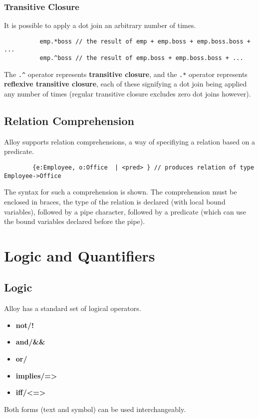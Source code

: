 \documentclass[10pt]{article}
\begin{document}
      \subsubsection*{Transitive Closure}
        It is possible to apply a dot join an arbitrary number of times.
        \begin{verbatim}
          emp.*boss // the result of emp + emp.boss + emp.boss.boss + ...
          emp.^boss // the result of emp.boss + emp.boss.boss + ...
        \end{verbatim}
        The \lstinline|.^| operator represents \textbf{transitive closure}, and the \lstinline|.*| operator represents \textbf{reflexive transitive closure}, each of these signifying a dot join being applied any number of times (regular transitive closure excludes zero dot joins however).
    \subsection*{Relation Comprehension}
      Alloy supports relation comprehensions, a way of specifiying a relation based on a predicate.
      \begin{verbatim}
        {e:Employee, o:Office  | <pred> } // produces relation of type Employee->Office
      \end{verbatim}
      The syntax for such a comprehension is shown. The comprehension must be enclosed in braces, the type of the relation is declared (with local bound variables), followed by a pipe character, followed by a predicate (which can use the bound variables declared before the pipe).

  \section*{Logic and Quantifiers}
    \subsection*{Logic}
      Alloy has a standard set of logical operators.
      \begin{itemize}
        \item\textbf{not/!}
        \item\textbf{and/\&\&}
        \item\textbf{or/\textbar\textbar}
        \item\textbf{implies/=\textgreater}
        \item\textbf{iff/\textless=\textgreater}
      \end{itemize}\par
      Both forms (text and symbol) can be used interchangeably.
\end{document}
